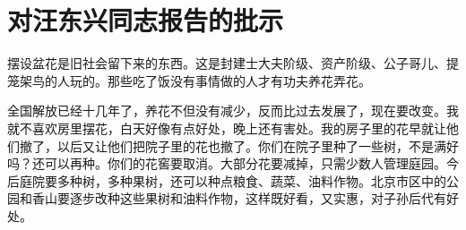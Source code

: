 \section[对汪东兴同志报告的批示（一九六四年七月）]{对汪东兴同志报告的批示}


摆设盆花是旧社会留下来的东西。这是封建士大夫阶级、资产阶级、公子哥儿、提笼架鸟的人玩的。那些吃了饭没有事情做的人才有功夫养花弄花。

全国解放已经十几年了，养花不但没有减少，反而比过去发展了，现在要改变。我就不喜欢房里摆花，白天好像有点好处，晚上还有害处。我的房子里的花早就让他们撤了，以后又让他们把院子里的花也撤了。你们在院子里种了一些树，不是满好吗？还可以再种。你们的花窖要取消。大部分花要减掉，只需少数人管理庭园。今后庭院要多种树，多种果树，还可以种点粮食、蔬菜、油料作物。北京市区中的公园和香山要逐步改种这些果树和油料作物，这样既好看，又实惠，对子孙后代有好处。



